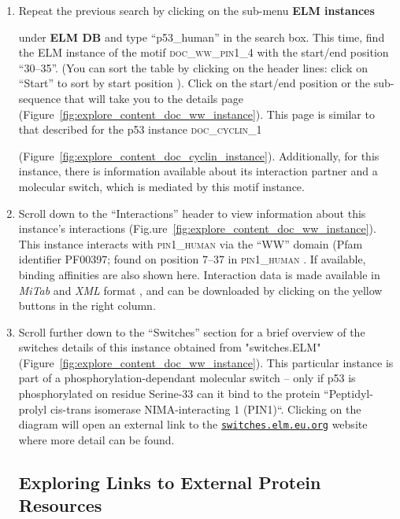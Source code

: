 \documentclass[12pt]{article}
\newcommand\rurl[1]{%
	\href{http://#1}{\nolinkurl{#1}}%
}
\newcommand\button[1]{%
	\textbf{#1}%
}
\newcommand\motif[1]{%
    \textsc{\lowercase{#1}}%
}
\newcommand\uniprot[1]{%
	\textsc{\lowercase{#1}}%
}
\newcommand\fileformat[1]{%
    \textit{#1}{}%
}%
\begin{document}
\begin{enumerate}
\item Repeat the previous search by clicking on the sub-menu \button{ELM instances}
	under \button{ELM DB} and type ``p53\_human'' in the search box. This time,
	find the ELM instance of the motif \motif{DOC\_WW\_Pin1\_4} with the
	start/end position ``30--35''. (You can sort the table by clicking on the
	header lines: click on ``Start'' to sort by start position ). Click on the
	start/end position or the sub-sequence that will take you to the details
	page (Figure~\ref{fig:explore_content_doc_ww_instance}). This
	page is similar to that described for the p53 instance \motif{DOC\_CYCLIN\_1}
	(Figure~\ref{fig:explore_content_doc_cyclin_instance}).
	Additionally, for this instance, there is information available about
	its interaction partner and a molecular switch, which is mediated by
	this motif instance.

\item Scroll down to the ``Interactions'' header to view information about this
	instance's interactions
	(Fig.ure~\ref{fig:explore_content_doc_ww_instance}). This instance
	interacts with \uniprot{PIN1\_Human} via the ``WW'' domain (Pfam identifier
	PF00397; found on position 7--37 in \uniprot{PIN1\_Human}. If available,
	binding affinities are also shown here. Interaction data is made
	available in \fileformat{MiTab} and \fileformat{XML} format
	\citep{17925023}, and can be downloaded by clicking on the yellow
	buttons in the right column.

\item Scroll further down to the ``Switches'' section for a brief overview of
	the switches details of this instance obtained from "switches.ELM"
	\citep{23550212} (Figure~\ref{fig:explore_content_doc_ww_instance}). This
	particular instance is part of a phosphorylation-dependant molecular switch --
	only if p53 is phosphorylated on residue Serine-33 can it bind to the protein
	``Peptidyl-prolyl cis-trans isomerase NIMA-interacting 1 (PIN1)``.
	Clicking on the diagram will open an external link to the
	\rurl{switches.elm.eu.org} website where more detail can be found.

%
%
\subsection*{Exploring Links to External Protein Resources}
\label{subsec:explore_content_links_to_external_resources}


\end{enumerate}
\end{document}
